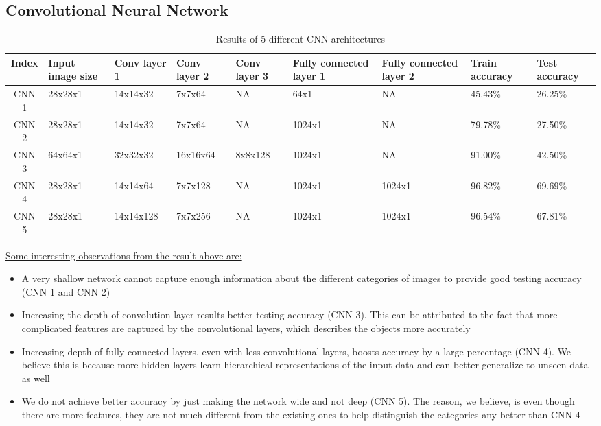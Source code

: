 \documentclass{article} %
\begin{document}
\subsection{Convolutional Neural Network}


\begin{table}[htbp]
    \begin{center}
    \begin{tabularx}{1.2\textwidth}{|c|X|X|X|X|X|X|X|X|}
        \hline
        Index & Input image size & Conv layer 1 & Conv layer 2 & Conv layer 3 & Fully connected layer 1 & Fully connected layer 2 & Train accuracy & Test accuracy \\
        \hline 
        CNN 1 & 28x28x1 & 14x14x32 & 7x7x64 & NA & 64x1 & NA & 45.43\% & 26.25\% \\
        \hline
        CNN 2 & 28x28x1 & 14x14x32 & 7x7x64 & NA & 1024x1 & NA & 79.78\% & 27.50\% \\
        \hline
        CNN 3 & 64x64x1 & 32x32x32 & 16x16x64 & 8x8x128 & 1024x1 & NA & 91.00\% & 42.50\% \\
        \hline
        CNN 4 & 28x28x1 & 14x14x64 & 7x7x128 & NA & 1024x1 & 1024x1 & 96.82\% & 69.69\% \\
        \hline
        CNN 5 & 28x28x1 & 14x14x128 & 7x7x256 & NA & 1024x1 & 1024x1 & 96.54\% & 67.81\% \\
        \hline
    \end{tabularx}
    \caption{Results of 5 different CNN architectures}
    \end{center}
\end{table}

\underline{Some interesting observations from the result above are:}
\begin{itemize}
\item
A very shallow network cannot capture enough information about the different categories of images to provide good testing accuracy (CNN 1 and CNN 2)
\item
Increasing the depth of convolution layer results better testing accuracy (CNN 3). This can be attributed to the fact that more complicated features are captured by the convolutional layers, which describes the objects more accurately
\item
Increasing depth of fully connected layers, even with less convolutional layers, boosts accuracy by a large percentage (CNN 4). We believe this is because more hidden layers learn hierarchical representations of the input data and can better generalize to unseen data as well
\item
We do not achieve better accuracy by just making the network wide and not deep (CNN 5). The reason, we believe, is even though there are more features, they are not much different from the existing ones to help distinguish the categories any better than CNN 4
\end{itemize}
\end{document}
